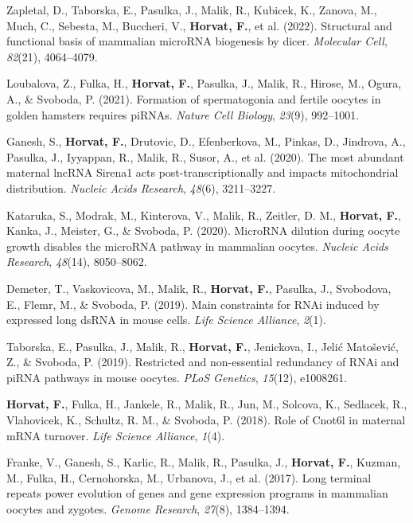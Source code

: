 \documentclass[11pt,a4paper,]{awesome-cv}
\begin{document}
\leavevmode{}%
Zapletal, D., Taborska, E., Pasulka, J., Malik, R., Kubicek, K., Zanova,
M., Much, C., Sebesta, M., Buccheri, V., \textbf{Horvat, F.}, et al.
(2022). Structural and functional basis of mammalian microRNA biogenesis
by dicer. \emph{Molecular Cell}, \emph{82}(21), 4064--4079.

\leavevmode{}%
Loubalova, Z., Fulka, H., \textbf{Horvat, F.}, Pasulka, J., Malik, R.,
Hirose, M., Ogura, A., \& Svoboda, P. (2021). Formation of spermatogonia
and fertile oocytes in golden hamsters requires piRNAs. \emph{Nature
Cell Biology}, \emph{23}(9), 992--1001.

\leavevmode{}%
Ganesh, S., \textbf{Horvat, F.}, Drutovic, D., Efenberkova, M., Pinkas,
D., Jindrova, A., Pasulka, J., Iyyappan, R., Malik, R., Susor, A., et
al. (2020). The most abundant maternal lncRNA Sirena1 acts
post-transcriptionally and impacts mitochondrial distribution.
\emph{Nucleic Acids Research}, \emph{48}(6), 3211--3227.

\leavevmode{}%
Kataruka, S., Modrak, M., Kinterova, V., Malik, R., Zeitler, D. M.,
\textbf{Horvat, F.}, Kanka, J., Meister, G., \& Svoboda, P. (2020).
MicroRNA dilution during oocyte growth disables the microRNA pathway in
mammalian oocytes. \emph{Nucleic Acids Research}, \emph{48}(14),
8050--8062.

\leavevmode{}%
Demeter, T., Vaskovicova, M., Malik, R., \textbf{Horvat, F.}, Pasulka,
J., Svobodova, E., Flemr, M., \& Svoboda, P. (2019). Main constraints
for RNAi induced by expressed long dsRNA in mouse cells. \emph{Life
Science Alliance}, \emph{2}(1).

\leavevmode{}%
Taborska, E., Pasulka, J., Malik, R., \textbf{Horvat, F.}, Jenickova,
I., Jelić Matošević, Z., \& Svoboda, P. (2019). Restricted and
non-essential redundancy of RNAi and piRNA pathways in mouse oocytes.
\emph{PLoS Genetics}, \emph{15}(12), e1008261.

\leavevmode{}%
\textbf{Horvat, F.}, Fulka, H., Jankele, R., Malik, R., Jun, M.,
Solcova, K., Sedlacek, R., Vlahovicek, K., Schultz, R. M., \& Svoboda,
P. (2018). Role of Cnot6l in maternal mRNA turnover. \emph{Life Science
Alliance}, \emph{1}(4).

\leavevmode{}%
Franke, V., Ganesh, S., Karlic, R., Malik, R., Pasulka, J.,
\textbf{Horvat, F.}, Kuzman, M., Fulka, H., Cernohorska, M., Urbanova,
J., et al. (2017). Long terminal repeats power evolution of genes and
gene expression programs in mammalian oocytes and zygotes. \emph{Genome
Research}, \emph{27}(8), 1384--1394.
\end{document}
